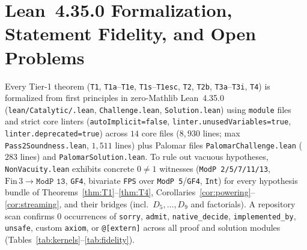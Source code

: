 \documentclass[11pt,reqno]{amsart}
\theoremstyle{definition}
\begin{document}
\section{Lean~4.35.0 Formalization, Statement Fidelity, and Open Problems}
\label{sec:lean}

Every Tier-1 theorem (\texttt{T1}, \texttt{T1a}--\texttt{T1e}, \texttt{T1s}--\texttt{T1esc}, \texttt{T2}, \texttt{T2b}, \texttt{T3a}--\texttt{T3i}, \texttt{T4}) is formalized from first principles in zero-Mathlib Lean~4.35.0 (\texttt{lean/\allowbreak Catalytic/\allowbreak *.lean}, \texttt{Challenge.\allowbreak lean}, \texttt{Solution.\allowbreak lean}) using \texttt{module} files and strict core linters (\texttt{autoImplicit=\allowbreak false}, \texttt{linter.\allowbreak unused\allowbreak Variables=\allowbreak true}, \texttt{linter.\allowbreak deprecated=\allowbreak true}) across $14$ core files ($8{,}930$ lines; max \texttt{Pass2\allowbreak Soundness.\allowbreak lean}, $1{,}511$ lines) plus Palomar files \texttt{Palomar\allowbreak Challenge.\allowbreak lean} ($283$ lines) and \texttt{Palomar\allowbreak Solution.\allowbreak lean}.
To rule out vacuous hypotheses, \texttt{Non\allowbreak Vacuity.\allowbreak lean} exhibits concrete $0 \neq 1$ witnesses (\texttt{ModP 2/5/7/11/13}, $\mathrm{Fin}\,3 \to \texttt{ModP 13}$, \texttt{GF4}, bivariate \texttt{FPS} over \texttt{ModP 5}/\texttt{GF4}, \texttt{Int}) for every hypothesis bundle of Theorems~\ref{thm:T1}--\ref{thm:T4}, Corollaries~\ref{cor:powering}--\ref{cor:streaming}, and their bridges (incl.\ $D_5, \dots, D_9$ and factorials).
A repository scan confirms $0$ occurrences of \texttt{sorry}, \texttt{admit}, \texttt{native\_\allowbreak decide}, \texttt{implemented\_\allowbreak by}, \texttt{unsafe}, custom \texttt{axiom}, or \texttt{@[extern]} across all proof and solution modules (Tables~\ref{tab:kernels}--\ref{tab:fidelity}).
\end{document}
